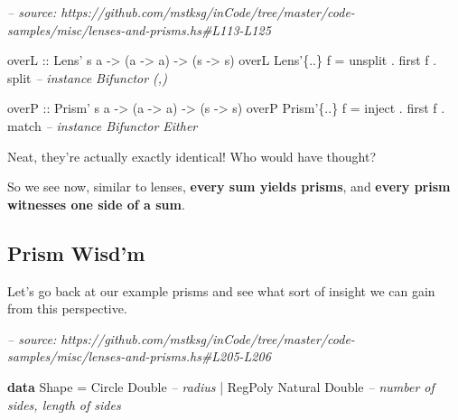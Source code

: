 \documentclass[]{article}
\newenvironment{Shaded}{}{}
\newcommand{\CommentTok}[1]{\textcolor[rgb]{0.38,0.63,0.69}{\textit{#1}}}
\newcommand{\DataTypeTok}[1]{\textcolor[rgb]{0.56,0.13,0.00}{#1}}
\newcommand{\FunctionTok}[1]{\textcolor[rgb]{0.02,0.16,0.49}{#1}}
\newcommand{\KeywordTok}[1]{\textcolor[rgb]{0.00,0.44,0.13}{\textbf{#1}}}
\newcommand{\NormalTok}[1]{#1}
\newcommand{\OtherTok}[1]{\textcolor[rgb]{0.00,0.44,0.13}{#1}}
\begin{document}
\begin{Shaded}
\begin{Highlighting}[]
\CommentTok{-- source: https://github.com/mstksg/inCode/tree/master/code-samples/misc/lenses-and-prisms.hs#L113-L125}

\OtherTok{overL ::} \DataTypeTok{Lens'}\NormalTok{ s a }\OtherTok{->}\NormalTok{ (a }\OtherTok{->}\NormalTok{ a) }\OtherTok{->}\NormalTok{ (s }\OtherTok{->}\NormalTok{ s)}
\NormalTok{overL }\DataTypeTok{Lens'}\NormalTok{\{}\FunctionTok{..}\NormalTok{\}  f }\FunctionTok{=}\NormalTok{ unsplit }\FunctionTok{.}\NormalTok{ first f }\FunctionTok{.}\NormalTok{ split   }\CommentTok{-- instance Bifunctor (,)}

\OtherTok{overP ::} \DataTypeTok{Prism'}\NormalTok{ s a }\OtherTok{->}\NormalTok{ (a }\OtherTok{->}\NormalTok{ a) }\OtherTok{->}\NormalTok{ (s }\OtherTok{->}\NormalTok{ s)}
\NormalTok{overP }\DataTypeTok{Prism'}\NormalTok{\{}\FunctionTok{..}\NormalTok{\} f }\FunctionTok{=}\NormalTok{ inject }\FunctionTok{.}\NormalTok{ first f }\FunctionTok{.}\NormalTok{ match    }\CommentTok{-- instance Bifunctor Either}
\end{Highlighting}
\end{Shaded}

Neat, they're actually exactly identical! Who would have thought?

So we see now, similar to lenses, \textbf{every sum yields prisms}, and
\textbf{every prism witnesses one side of a sum}.

\hypertarget{prism-wisdm}{%
\subsection{Prism Wisd'm}\label{prism-wisdm}}

Let's go back at our example prisms and see what sort of insight we can gain
from this perspective.

\begin{Shaded}
\begin{Highlighting}[]
\CommentTok{-- source: https://github.com/mstksg/inCode/tree/master/code-samples/misc/lenses-and-prisms.hs#L205-L206}

\KeywordTok{data} \DataTypeTok{Shape} \FunctionTok{=} \DataTypeTok{Circle}  \DataTypeTok{Double}           \CommentTok{-- radius}
           \FunctionTok{|} \DataTypeTok{RegPoly} \DataTypeTok{Natural} \DataTypeTok{Double}   \CommentTok{-- number of sides, length of sides}
\end{Highlighting}
\end{Shaded}
\end{document}
